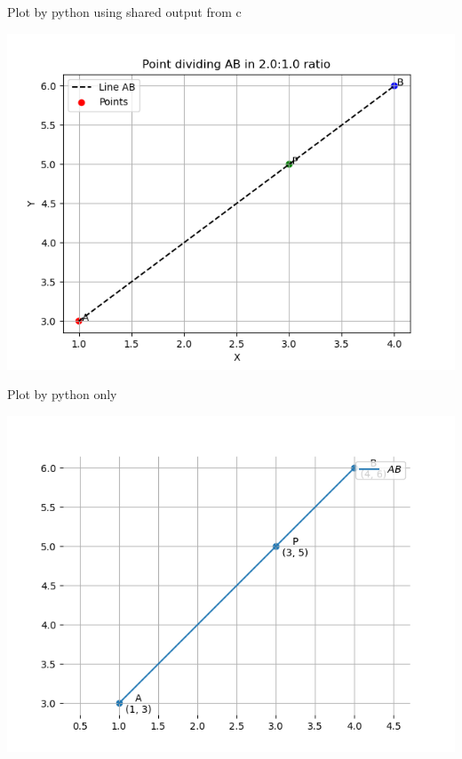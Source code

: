 \documentclass{beamer}
\begin{document}
\begin{frame}{Plot by python using shared output from c}
	\begin{center}
		\includegraphics[width=\linewidth]{figs/q1.1.png}
	\end{center}
\end{frame}

\begin{frame}{Plot by python only}
	\begin{center}
		\includegraphics[width=\linewidth]{figs/q1.2.png}
	\end{center}
\end{frame}
\end{document}
